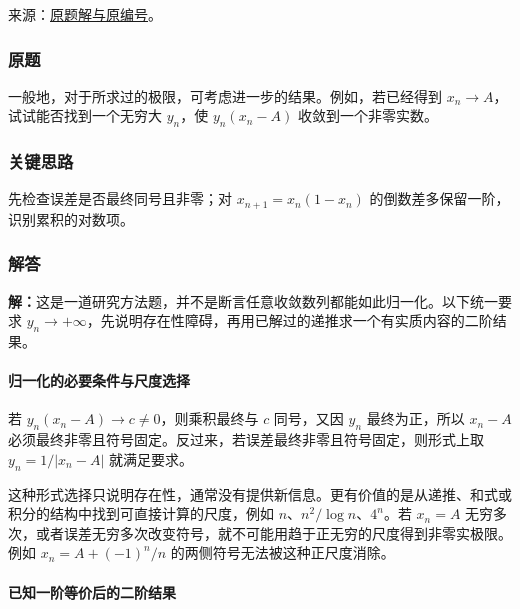 \documentclass[11pt,a4paper]{article}
\begin{document}
来源：\href{https://zj139.github.io/math-notes/problems/0ce2ad9c1d045270806e755b/\#问题-b41}{原题解与原编号}。

\subsubsection{原题}\label{ux539fux9898-6}

一般地，对于所求过的极限，可考虑进一步的结果。例如，若已经得到
\(x_n\to A\)，试试能否找到一个无穷大 \(y_n\)，使 \(y_n(x_n-A)\)
收敛到一个非零实数。

\subsubsection{关键思路}\label{ux5173ux952eux601dux8def-6}

先检查误差是否最终同号且非零；对 \(x_{n+1}=x_n(1-x_n)\)
的倒数差多保留一阶，识别累积的对数项。

\subsubsection{解答}\label{ux89e3ux7b54-6}

\textbf{解：}这是一道研究方法题，并不是断言任意收敛数列都能如此归一化。以下统一要求
\(y_n\to+\infty\)，先说明存在性障碍，再用已解过的递推求一个有实质内容的二阶结果。

\paragraph{归一化的必要条件与尺度选择}\label{ux5f52ux4e00ux5316ux7684ux5fc5ux8981ux6761ux4ef6ux4e0eux5c3aux5ea6ux9009ux62e9}

若 \(y_n(x_n-A)\to c\ne0\)，则乘积最终与 \(c\) 同号，又因 \(y_n\)
最终为正，所以 \(x_n-A\)
必须最终非零且符号固定。反过来，若误差最终非零且符号固定，则形式上取
\(y_n=1/|x_n-A|\) 就满足要求。

这种形式选择只说明存在性，通常没有提供新信息。更有价值的是从递推、和式或积分的结构中找到可直接计算的尺度，例如
\(n\)、\(n^2/\log n\)、\(4^n\)。若 \(x_n=A\)
无穷多次，或者误差无穷多次改变符号，就不可能用趋于正无穷的尺度得到非零实极限。例如
\(x_n=A+(-1)^n/n\) 的两侧符号无法被这种正尺度消除。

\paragraph{已知一阶等价后的二阶结果}\label{ux5df2ux77e5ux4e00ux9636ux7b49ux4ef7ux540eux7684ux4e8cux9636ux7ed3ux679c}
\end{document}
